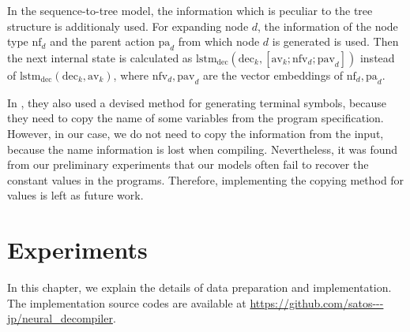 \documentclass[senior,final,11pt]{iscs-thesis}
\begin{document}

In the sequence-to-tree model, the information which is peculiar to the tree structure is additionaly used.
For expanding node $d$, the information of the node type $ \mathrm{nf}_{d} $ and the parent action $\mathrm{pa}_{d}$ from which node $d$ is generated is used.
Then the next internal state is calculated as $ \mathrm{lstm}_{\mathrm{dec}}(\mathrm{dec}_{k},[\mathrm{av}_{k}; \mathrm{nfv}_{d}; \mathrm{pav}_{d}]) $ instead of $ \mathrm{lstm}_{\mathrm{dec}}(\mathrm{dec}_{k},\mathrm{av}_{k}) $, 
where $\mathrm{nfv}_{d},\mathrm{pav}_{d}$ are the vector embeddings of $\mathrm{nf}_{d},\mathrm{pa}_{d}$.

In \citet{Seq2Tree}, they also used a devised method for generating terminal symbols, because they need to copy the name of some variables from the program specification.
However, in our case, we do not need to copy the information from the input, because the name information is lost when compiling.
Nevertheless, it was found from our preliminary experiments that our models often fail to recover the constant values in the programs.
Therefore, implementing the copying method for values is left as future work.



\chapter{Experiments}
In this chapter, we explain the details of data preparation and implementation.
The implementation source codes are available at \url{https://github.com/satos---jp/neural_decompiler}.  
\end{document}
